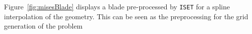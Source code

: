 





Figure~\ref{fig:misesBlade} displays a blade pre-processed by \texttt{ISET} for a spline interpolation of the geometry. This can be seen as the preprocessing for the grid generation of the
problem

